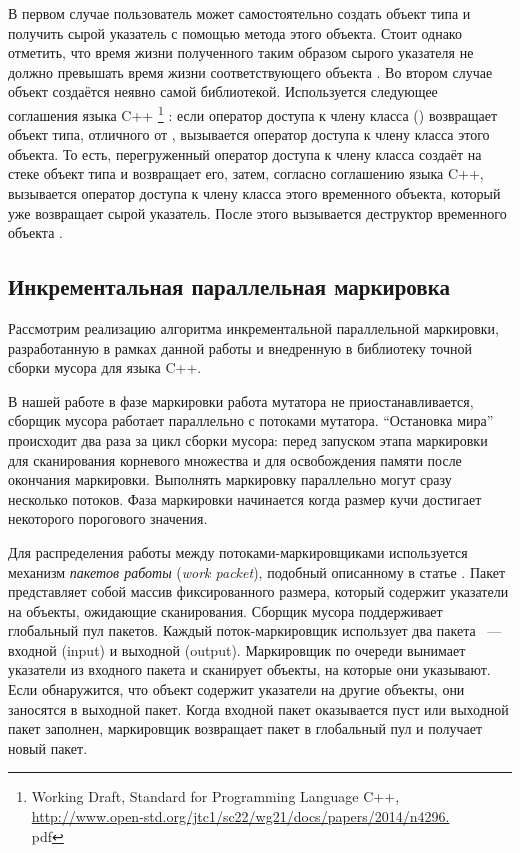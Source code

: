 В первом случае пользователь может самостоятельно создать объект типа  и 
получить сырой указатель с помощью метода  этого объекта. 
Стоит однако отметить, что время жизни полученного таким образом сырого указателя не 
должно превышать время жизни соответствующего объекта . 
Во втором случае объект  создаётся неявно самой библиотекой. 
Используется следующее соглашения языка C++ 
\footnote{Working Draft, Standard for Programming Language C++,\\
\url{http://www.open-std.org/jtc1/sc22/wg21/docs/papers/2014/n4296.}\\{pdf}}
: если оператор доступа к 
члену класса () возвращает объект типа, отличного от , 
вызывается оператор доступа к члену класса этого объекта. 
То есть, перегруженный оператор доступа к члену класса  создаёт на стеке 
объект типа  и возвращает его, затем, согласно соглашению языка C++, 
вызывается оператор доступа к члену класса этого временного объекта, который уже возвращает 
сырой указатель. 
После этого вызывается деструктор временного объекта .  


\subsection{Инкрементальная параллельная маркировка}
Рассмотрим реализацию алгоритма инкрементальной параллельной маркировки, разработанную в 
рамках данной работы и внедренную в библиотеку точной сборки мусора для языка C++.

В нашей работе в фазе маркировки работа мутатора не приостанавливается, сборщик мусора 
работает параллельно с потоками мутатора. 
``Остановка мира'' происходит два раза за цикл сборки мусора: перед запуском этапа 
маркировки для сканирования корневого множества и для освобождения памяти после 
окончания маркировки. 
Выполнять маркировку параллельно могут сразу несколько потоков. 
Фаза маркировки начинается когда размер кучи достигает некоторого порогового значения. 

Для распределения работы между потоками-маркировщиками используется механизм 
\emph{пакетов работы} (\emph{work packet}), подобный описанному в статье 
\cite{barabash2005parallel}. 
Пакет представляет собой массив фиксированного размера, который содержит указатели на 
объекты, ожидающие сканирования. 
Сборщик мусора поддерживает глобальный пул пакетов. 
Каждый поток-маркировщик использует два пакета ~---~ входной (input) и выходной (output). 
Маркировщик по очереди вынимает указатели из входного пакета и сканирует объекты, на которые 
они указывают. 
Если обнаружится, что объект содержит указатели на другие объекты, они заносятся в выходной 
пакет. 
Когда входной пакет оказывается пуст или выходной пакет заполнен, маркировщик возвращает пакет 
в глобальный пул и получает новый пакет. 


